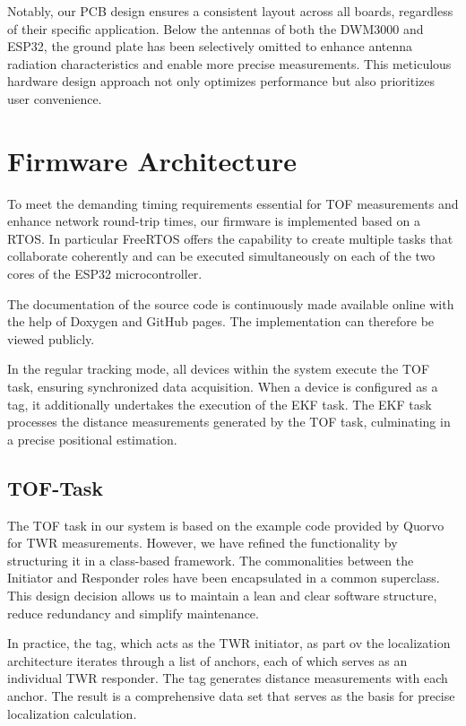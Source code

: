 \documentclass[conference, a4paper]{IEEEtran}
\begin{document}
Notably, our PCB design ensures a consistent layout across all boards,
regardless of their specific application.
Below the antennas of both the DWM3000 and ESP32,
the ground plate has been selectively omitted to enhance antenna radiation
characteristics and enable more precise measurements.
This meticulous hardware design approach not only optimizes
performance but also prioritizes user convenience. 


\section{Firmware Architecture}\label{section:firmware}
To meet the demanding timing requirements essential for \ac{TOF}
measurements and enhance network round-trip times,
our firmware is implemented based on a \ac{RTOS}.
In particular FreeRTOS \cite{FreeRTOS_2023} offers the capability to create multiple tasks that collaborate coherently and can be executed simultaneously on each of the two cores of the ESP32 microcontroller.

The documentation of the source code is continuously made available online with the help of Doxygen and GitHub pages.
The implementation can therefore be viewed publicly\cite{doxygen-doku}.

In the regular tracking mode,
all devices within the system execute the TOF task, ensuring synchronized data acquisition.
When a device is configured as a tag,
it additionally undertakes the execution of the \ac{EKF} task.
The \ac{EKF} task processes the distance measurements generated by the TOF task,
culminating in a precise positional estimation.

\subsection{TOF-Task}\label{section:firmware-tof}
The \ac{TOF} task in our system is based on the example code
provided by Quorvo for \ac{TWR} measurements.
However, we have refined the functionality by structuring it in a class-based framework.
The commonalities between the Initiator and Responder roles have been
encapsulated in a common superclass.
This design decision allows us to maintain a lean and clear software structure,
reduce redundancy and simplify maintenance.

In practice, the tag, which acts as the \ac{TWR} initiator, as part ov the localization architecture iterates through a list of anchors, each of which serves as an individual \ac{TWR} responder. 
The tag generates distance measurements with each anchor. 
The result is a comprehensive data set that serves as the basis for precise localization calculation. 
\end{document}
